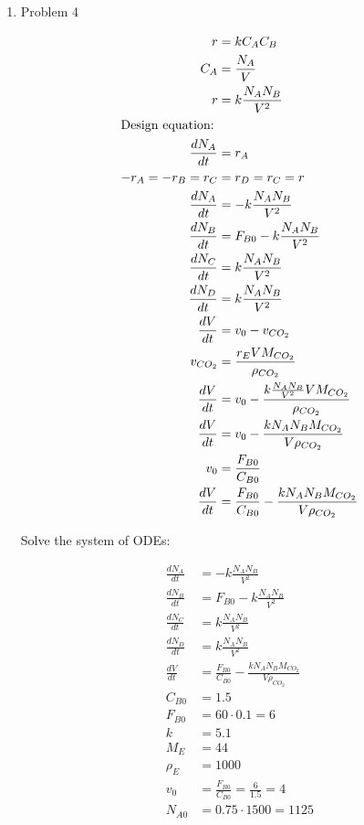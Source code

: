 \documentclass[12pt]{article}
\begin{document}
\begin{enumerate}
    \item Problem 4

    \begin{align*}
        r &= k C_A C_B \\
        C_A &= \frac{N_A}{V} \\
        r &= k \frac{N_A N_B}{V^2} \\
        \intertext{Design equation:}
        \frac{dN_A}{dt} &= r_A \\
        -r_A = -r_B = r_C &= r_D = r_C = r \\
        \frac{dN_A}{dt} &= -k \frac{N_A N_B}{V^2} \\
        \frac{dN_B}{dt} &= F_{B0} - k \frac{N_A N_B}{V^2} \\
        \frac{dN_C}{dt} &= k \frac{N_A N_B}{V^2} \\
        \frac{dN_D}{dt} &= k \frac{N_A N_B}{V^2} \\
        \frac{dV}{dt} &= v_0 - v_{CO_2} \\
        v_{CO_2} &= \frac{r_E V M_{CO_2}}{\rho_{CO_2}} \\
        \frac{dV}{dt} &= v_0 - \frac{k \frac{N_A N_B}{V^2} V M_{CO_2}}{\rho_{CO_2}} \\
        \frac{dV}{dt} &= v_0 - \frac{k N_A N_B M_{CO_2}}{V \rho_{CO_2}} \\
        v_0 &= \frac{F_{B0}}{C_{B0}} \\
        \frac{dV}{dt} &= \frac{F_{B0}}{C_{B0}} - \frac{k N_A N_B M_{CO_2}}{V \rho_{CO_2}}
    \end{align*}

    Solve the system of ODEs:

    \begin{align*}
        \frac{dN_A}{dt} &= -k \frac{N_A N_B}{V^2} \\
        \frac{dN_B}{dt} &= F_{B0} - k \frac{N_A N_B}{V^2} \\
        \frac{dN_C}{dt} &= k \frac{N_A N_B}{V^2} \\
        \frac{dN_D}{dt} &= k \frac{N_A N_B}{V^2} \\
        \frac{dV}{dt} &= \frac{F_{B0}}{C_{B0}} - \frac{k N_A N_B M_{CO_2}}{V \rho_{CO_2}} \\
        C_{B0} &= 1.5 \\
        F_{B0} &= 60 \cdot 0.1 = 6 \\
        k &= 5.1 \\
        M_E &= 44 \\
        \rho_E &= 1000 \\
        v_0 &= \frac{F_{B0}}{C_{B0}} = \frac{6}{1.5} = 4 \\
        N_{A0} &= 0.75 \cdot 1500 = 1125
    \end{align*}


\end{enumerate}
\end{document}
